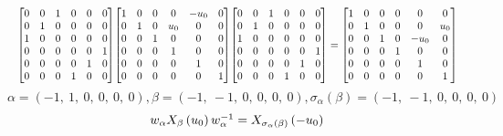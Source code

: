 \documentclass[11pt]{article}
\theoremstyle{definition}
\begin{document}
\[
\scaletoalign{\textwidth}{{\left[\begin{matrix}0 & 0 & 1 & 0 & 0 & 0\\0 & 1 & 0 & 0 & 0 & 0\\1 & 0 & 0 & 0 & 0 & 0\\0 & 0 & 0 & 0 & 0 & 1\\0 & 0 & 0 & 0 & 1 & 0\\0 & 0 & 0 & 1 & 0 & 0\end{matrix}\right]} {\left[\begin{matrix}1 & 0 & 0 & 0 & - u_{0} & 0\\0 & 1 & 0 & u_{0} & 0 & 0\\0 & 0 & 1 & 0 & 0 & 0\\0 & 0 & 0 & 1 & 0 & 0\\0 & 0 & 0 & 0 & 1 & 0\\0 & 0 & 0 & 0 & 0 & 1\end{matrix}\right]} {\left[\begin{matrix}0 & 0 & 1 & 0 & 0 & 0\\0 & 1 & 0 & 0 & 0 & 0\\1 & 0 & 0 & 0 & 0 & 0\\0 & 0 & 0 & 0 & 0 & 1\\0 & 0 & 0 & 0 & 1 & 0\\0 & 0 & 0 & 1 & 0 & 0\end{matrix}\right]} = {\left[\begin{matrix}1 & 0 & 0 & 0 & 0 & 0\\0 & 1 & 0 & 0 & 0 & u_{0}\\0 & 0 & 1 & 0 & - u_{0} & 0\\0 & 0 & 0 & 1 & 0 & 0\\0 & 0 & 0 & 0 & 1 & 0\\0 & 0 & 0 & 0 & 0 & 1\end{matrix}\right]}}
\]
\[
\alpha = \left( -1, \  1, \  0, \  0, \  0, \  0\right), \beta = \left( -1, \  -1, \  0, \  0, \  0, \  0\right), \sigma_{\alpha}(\beta) = \left( -1, \  -1, \  0, \  0, \  0, \  0\right)
\]
\[
\scaletoalign{\textwidth}{w_{\alpha} X_{\beta}\left(u_{0}\right) w_{\alpha}^{-1} = X_{\sigma_{\alpha}\left(\beta\right)}\left(- u_{0}\right)}
\]
\end{document}

